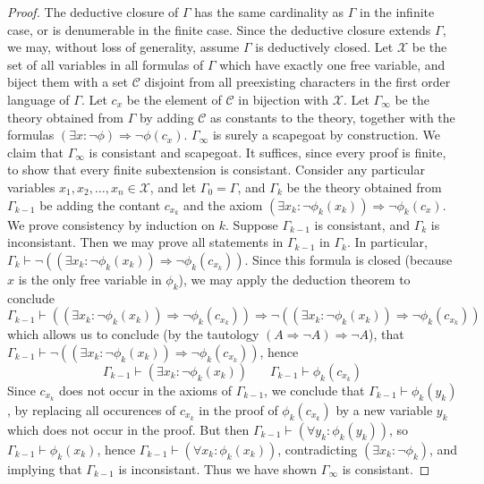 \begin{proof}
    The deductive closure of $\Gamma$ has the same cardinality as $\Gamma$ in the infinite case, or is denumerable in the finite case. Since the deductive closure extends $\Gamma$, we may, without loss of generality, assume $\Gamma$ is deductively closed. Let $\mathcal{X}$ be the set of all variables in all formulas of $\Gamma$ which have exactly one free variable, and biject them with a set $\mathcal{C}$ disjoint from all preexisting characters in the first order language of $\Gamma$. Let $c_x$ be the element of $\mathcal{C}$ in bijection with $\mathcal{X}$. Let $\Gamma_\infty$ be the theory obtained from $\Gamma$ by adding $\mathcal{C}$ as constants to the theory, together with the formulas $(\exists x: \neg \phi) \Rightarrow \neg \phi(c_x)$. $\Gamma_\infty$ is surely a scapegoat by construction. We claim that $\Gamma_\infty$ is consistant and scapegoat. It suffices, since every proof is finite, to show that every finite subextension is consistant. Consider any particular variables $x_1, x_2, \dots, x_n \in \mathcal{X}$, and let $\Gamma_0 = \Gamma$, and $\Gamma_k$ be the theory obtained from $\Gamma_{k-1}$ be adding the contant $c_{x_k}$ and the axiom $(\exists x_k: \neg \phi_k(x_k)) \Rightarrow \neg \phi_k(c_x)$. We prove consistency by induction on $k$. Suppose $\Gamma_{k-1}$ is consistant, and $\Gamma_k$ is inconsistant. Then we may prove all statements in $\Gamma_{k-1}$ in $\Gamma_k$. In particular, $\Gamma_k \vdash \neg ((\exists x_k: \neg \phi_k(x_k)) \Rightarrow \neg \phi_k(c_{x_k}))$. Since this formula is closed (because $x$ is the only free variable in $\phi_k$), we may apply the deduction theorem to conclude
    \[ \Gamma_{k-1} \vdash ((\exists x_k: \neg \phi_k(x_k)) \Rightarrow \neg \phi_k(c_{x_k})) \Rightarrow \neg ((\exists x_k: \neg \phi_k(x_k)) \Rightarrow \neg \phi_k(c_{x_k})) \]
    which allows us to conclude (by the tautology $(A \Rightarrow \neg A) \Rightarrow \neg A$), that $\Gamma_{k-1} \vdash \neg ((\exists x_k: \neg \phi_k(x_k)) \Rightarrow \neg \phi_k(c_{x_k}))$, hence
    \[ \Gamma_{k-1} \vdash (\exists x_k: \neg \phi_k(x_k))\ \ \ \ \ \ \ \ \Gamma_{k-1} \vdash \phi_k(c_{x_k}) \]
    Since $c_{x_k}$ does not occur in the axioms of $\Gamma_{k-1}$, we conclude that $\Gamma_{k-1} \vdash \phi_k(y_k)$, by replacing all occurences of $c_{x_k}$ in the proof of $\phi_k(c_{x_k})$ by a new variable $y_k$ which does not occur in the proof. But then $\Gamma_{k-1} \vdash (\forall y_k: \phi_k(y_k))$, so $\Gamma_{k-1} \vdash \phi_k(x_k)$, hence $\Gamma_{k-1} \vdash (\forall x_k: \phi_k(x_k))$, contradicting $(\exists x_k: \neg \phi_k)$, and implying that $\Gamma_{k-1}$ is inconsistant. Thus we have shown $\Gamma_\infty$ is consistant.
\end{proof}

